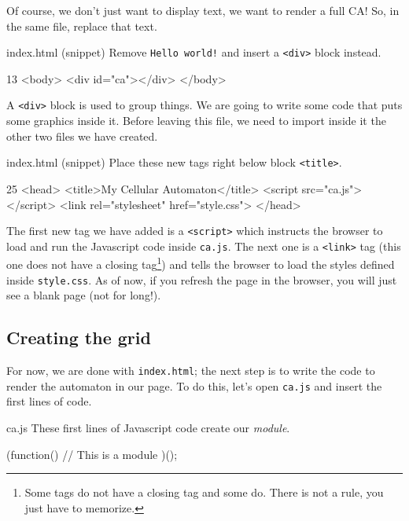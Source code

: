 Of course, we don't just want to display text, we want to render a full CA! So, in the same file, replace
that text.

\begin{programcode}{index.html (snippet)}
Remove \texttt{Hello world!} and insert a \texttt{<div>} block instead.
\begin{codehtmlh1}{1}{3}
<body>
  <div id="ca"></div>
</body>
\end{codehtmlh1}
\end{programcode}

A \texttt{<div>} block is used to group things. We are going to write some code that puts some graphics
inside it. Before leaving this file, we need to import inside it the other two files we have created.

\begin{programcode}{index.html (snippet)}
Place these new tags right below block \texttt{<title>}.
\begin{codehtmlh1}{2}{5}
<head>
  <title>My Cellular Automaton</title>
  <script src="ca.js"></script>
  <link rel="stylesheet" href="style.css">
</head>
\end{codehtmlh1}
\end{programcode}

The first new tag we have added is a \texttt{<script>} which instructs the browser to load and run the
Javascript code inside \texttt{ca.js}. The next one is a \texttt{<link>} tag (this one does not have a closing
tag\footnote{Some tags do not have a closing tag and some do. There is not a rule, you just have
to memorize.})
and tells the browser to load the styles defined inside \texttt{style.css}. As of now, if you refresh the
page in the browser, you will just see a blank page (not for long!).

\subsection{Creating the grid}
For now, we are done with \texttt{index.html}; the next step is to write the code to render the automaton
in our page. To do this, let's open \texttt{ca.js} and insert the first lines of code.

\begin{programcode}{ca.js}
These first lines of Javascript code create our \textit{module}.
\begin{code}
(function(){
  // This is a module
})();
\end{code}
\end{programcode}


